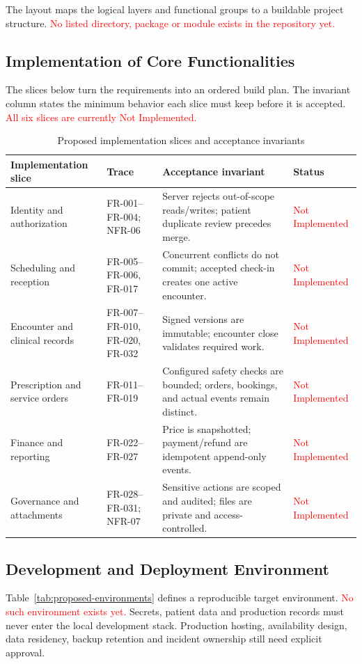 \documentclass[a4paper,12pt]{article}
\newcommand{\weak}[1]{\textcolor{red}{#1}}
\begin{document}
The layout maps the logical layers and functional groups to a buildable project structure. \weak{No listed directory, package or module exists in the repository yet.}

\subsection{Implementation of Core Functionalities}
The slices below turn the requirements into an ordered build plan. The invariant column states the minimum behavior each slice must keep before it is accepted. \weak{All six slices are currently Not Implemented.}

\begin{table}[H]
\centering
\small
\renewcommand{\arraystretch}{1.12}
\begin{tabularx}{\textwidth}{@{}P{0.22\textwidth}P{0.23\textwidth}P{0.37\textwidth}Y@{}}
\toprule
Implementation slice & Trace & Acceptance invariant & Status \\
\midrule
Identity and authorization & FR-001--FR-004; NFR-06 & Server rejects out-of-scope reads/writes; patient duplicate review precedes merge. & \weak{Not Implemented} \\
Scheduling and reception & FR-005--FR-006, FR-017 & Concurrent conflicts do not commit; accepted check-in creates one active encounter. & \weak{Not Implemented} \\
Encounter and clinical records & FR-007--FR-010, FR-020, FR-032 & Signed versions are immutable; encounter close validates required work. & \weak{Not Implemented} \\
Prescription and service orders & FR-011--FR-019 & Configured safety checks are bounded; orders, bookings, and actual events remain distinct. & \weak{Not Implemented} \\
Finance and reporting & FR-022--FR-027 & Price is snapshotted; payment/refund are idempotent append-only events. & \weak{Not Implemented} \\
Governance and attachments & FR-028--FR-031; NFR-07 & Sensitive actions are scoped and audited; files are private and access-controlled. & \weak{Not Implemented} \\
\bottomrule
\end{tabularx}
\caption{Proposed implementation slices and acceptance invariants}
\label{tab:implementation-status}
\end{table}

\subsection{Development and Deployment Environment}
Table~\ref{tab:proposed-environments} defines a reproducible target environment. \weak{No such environment exists yet.} Secrets, patient data and production records must never enter the local development stack. Production hosting, availability design, data residency, backup retention and incident ownership still need explicit approval.
\end{document}
